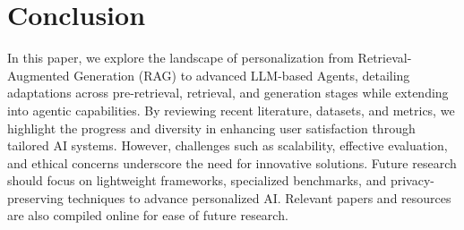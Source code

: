 \section{Conclusion}
In this paper, we explore the landscape of personalization from Retrieval-Augmented Generation (RAG) to advanced LLM-based Agents, detailing adaptations across pre-retrieval, retrieval, and generation stages while extending into agentic capabilities. By reviewing recent literature, datasets, and metrics, we highlight the progress and diversity in enhancing user satisfaction through tailored AI systems. 
However, challenges such as scalability, effective evaluation, and ethical concerns underscore the need for innovative solutions. Future research should focus on lightweight frameworks, specialized benchmarks, and privacy-preserving techniques to advance personalized AI. 
Relevant papers and resources are also compiled online for ease of future research.